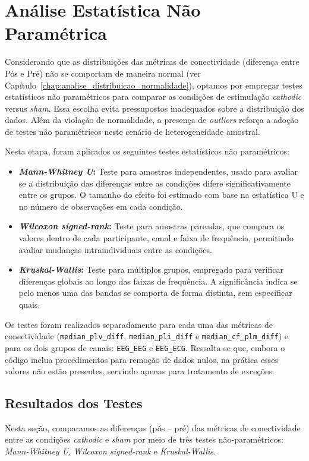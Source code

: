 \chapter{Análise Estatística Não Paramétrica}
\label{chap:analise_estatistica_np}
Considerando que as distribuições das métricas de conectividade (diferença entre Pós e Pré) não se comportam de maneira normal (ver Capítulo~\ref{chap:analise_distribuicao_normalidade}), optamos por empregar testes estatísticos não paramétricos para comparar as condições de estimulação \textit{cathodic} versus \textit{sham}. Essa escolha evita pressupostos inadequados sobre a distribuição dos dados. Além da violação de normalidade, a presença de \textit{outliers} reforça a adoção de testes não paramétricos neste cenário de heterogeneidade amostral.

Nesta etapa, foram aplicados os seguintes testes estatísticos não paramétricos:

\begin{itemize}
    \item \textbf{\textit{Mann-Whitney U}:} Teste para amostras independentes, usado para avaliar se a distribuição das diferenças entre as condições difere significativamente entre os grupos. O tamanho do efeito foi estimado com base na estatística U e no número de observações em cada condição.
    
    \item \textbf{\textit{Wilcoxon signed-rank}:} Teste para amostras pareadas, que compara os valores dentro de cada participante, canal e faixa de frequência, permitindo avaliar mudanças intraindividuais entre as condições.

    \item \textbf{\textit{Kruskal-Wallis}:} Teste para múltiplos grupos, empregado para verificar diferenças globais ao longo das faixas de frequência. A significância indica se pelo menos uma das bandas se comporta de forma distinta, sem especificar quais.
\end{itemize}

Os testes foram realizados separadamente para cada uma das métricas de conectividade (\texttt{median\_plv\_diff}, \texttt{median\_pli\_diff} e \texttt{median\_cf\_plm\_diff}) e para os dois grupos de canais: \texttt{EEG\_EEG} e \texttt{EEG\_ECG}. Ressalta-se que, embora o código inclua procedimentos para remoção de dados nulos, na prática esses valores não estão presentes, servindo apenas para tratamento de exceções.

\section{Resultados dos Testes}
Nesta seção, comparamos as diferenças (pós -- pré) das métricas de conectividade entre as condições \textit{cathodic} e \textit{sham} por meio de três testes não-paramétricos: \textit{Mann-Whitney U}, \textit{Wilcoxon signed-rank} e \textit{Kruskal-Wallis}. 


